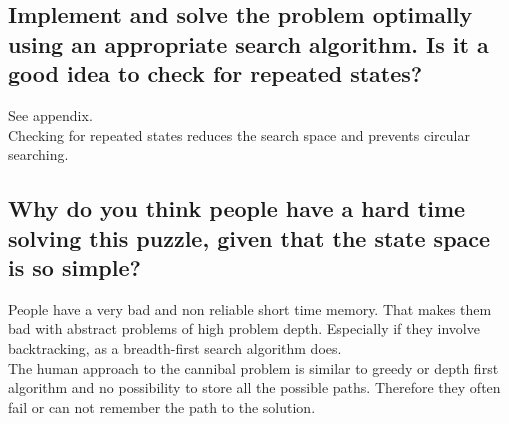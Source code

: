 \documentclass{scrreprt}
\begin{document}
\subsection*{Implement and solve the problem optimally using an appropriate search algorithm. Is it a good
idea to check for repeated states?}
See appendix.\\
Checking for repeated states reduces the search space and prevents circular searching.

\subsection*{Why do you think people have a hard time solving this puzzle, given that the state space is so
simple?}
People have a very bad and non reliable short time memory. That makes them bad with abstract problems of high problem depth. Especially if they involve backtracking, as a breadth-first search algorithm does.\\
The human approach to the cannibal problem is similar to greedy or depth first algorithm and no possibility to store all the possible paths. Therefore they often fail or can not remember the path to the solution.
\end{document}
